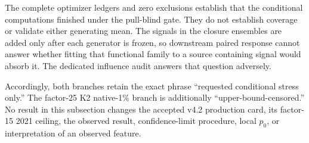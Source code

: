The complete optimizer ledgers and zero exclusions establish that the
conditional computations finished under the pull-blind gate.  They do not
establish coverage or validate either generating mean.  The signals in the
closure ensembles are added only after each generator is frozen, so downstream
paired response cannot answer whether fitting that functional family to a
source containing signal would absorb it.  The dedicated influence audit
answers that question adversely.

Accordingly, both branches retain the exact phrase ``requested conditional
stress only.''  The factor-25 K2 native-1\% branch is additionally
``upper-bound-censored.''  No result in this subsection changes the accepted
v4.2 production card, its factor-15 2021 ceiling, the observed result,
confidence-limit procedure, local $p_0$, or interpretation of an observed
feature.

\FloatBarrier

